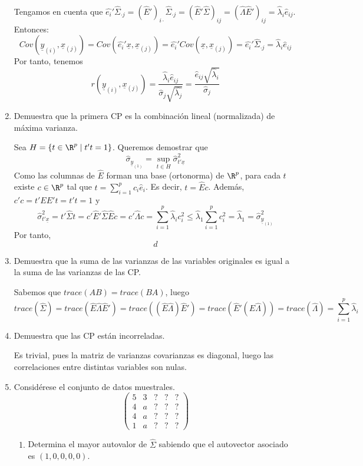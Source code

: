 \documentclass[twoside]{article}
\newcommand{\muestra}[1]{{\underline{#1}}}
\begin{document}
\begin{enumerate}
Tengamos en cuenta que $\hat{e_i}'\hat{\Sigma}_{\cdot j} = (\hat{E}')_{i \cdot}\hat{\Sigma}_{\cdot j}=(\hat{E}'\hat{\Sigma})_{ij}=(\hat{\Lambda}\hat{E}')_{ij}=\hat{\lambda}_i \hat{e}_{ij}$. Entonces:
$$
Cov(\muestra{y}_{{(i)}},\muestra{x}_{{(j)}}) = Cov(\hat{e_i}' \muestra{x},\muestra{x}_{{(j)}}) = \hat{e_i}'Cov(\muestra{x},\muestra{x}_{(j)})= \hat{e_i}'\hat{\Sigma}_{\cdot j} = \hat{\lambda}_i \hat{e}_{ij}
$$ 
Por tanto, tenemos
$$
r(\muestra{y}_{{(i)}},\muestra{x}_{{(j)}}) = \frac{\hat{\lambda}_i \hat{e}_{ij}}{\hat{\sigma}_{j}\sqrt{\hat{\lambda_j}}} = \frac{\hat{e}_{ij}\sqrt{\hat{\lambda}_i}}{\hat{\sigma}_j}
$$
\item Demuestra que la primera CP es la combinación lineal (normalizada) de máxima varianza. 

Sea $H=\{t\in \R^p \mid t't=1\}$. Queremos demostrar que
$$
\hat{\sigma}_{\muestra{y}_{(1)}}=\sup_{t\in H}\hat{\sigma}^2_{t'\muestra{x}}
$$
Como las columnas de $\hat{E}$ forman una base (ortonorma) de $\R^p$, para cada $t$ existe $c\in \R^p$ tal que $t = \sum_{i=1}^p c_i \hat{e}_i$. Es decir, $t=\hat{E}c$. Además, $c'c = t'EE't=t't=1$ y
$$
\hat{\sigma}^2_{t'\muestra{x}} = t'\hat{\Sigma}t =  c'\hat{E}'\hat{\Sigma}\hat{E}c = c'\hat{\Lambda}c = \sum_{i=1}^p \hat{\lambda}_i c_i^2 \leq \hat{\lambda}_1 \sum_{i=1}^p  c_i^2 = \hat{\lambda}_1 = \hat{\sigma}^2_{\muestra{y}_{(1)}}
$$
Por tanto,
$$
d
$$
\item Demuestra que la suma de las varianzas de las variables originales es igual a la suma de las varianzas de las CP.

Sabemos que $trace(AB)=trace(BA)$, luego
$$
trace(\hat{\Sigma})=trace(\hat{E}\hat{\Lambda}\hat{E}')=trace((\hat{E}\hat{\Lambda})\hat{E}') = trace(\hat{E}'(\hat{E}\hat{\Lambda})) = trace(\hat{\Lambda})=\sum_{i=1}^p \hat{\lambda}_i
$$
\item Demuestra que las CP están incorreladas.

Es trivial, pues la matriz de varianzas covarianzas es diagonal, luego las correlaciones entre distintas variables son nulas.
\item Considérese el conjunto de datos muestrales.
\[ \begin{pmatrix}5 & 3 & ? & ? & ?\\4 & a & ? & ? & ?\\4 & a & ? & ? & ?\\1 & a & ? & ? & ?\end{pmatrix}\]
\begin{enumerate}
	\item Determina el mayor autovalor de $\widehat{\Sigma}$ sabiendo que el autovector asociado es $(1,0,0,0,0)$.
	

\end{enumerate}
\end{enumerate}
\end{document}
